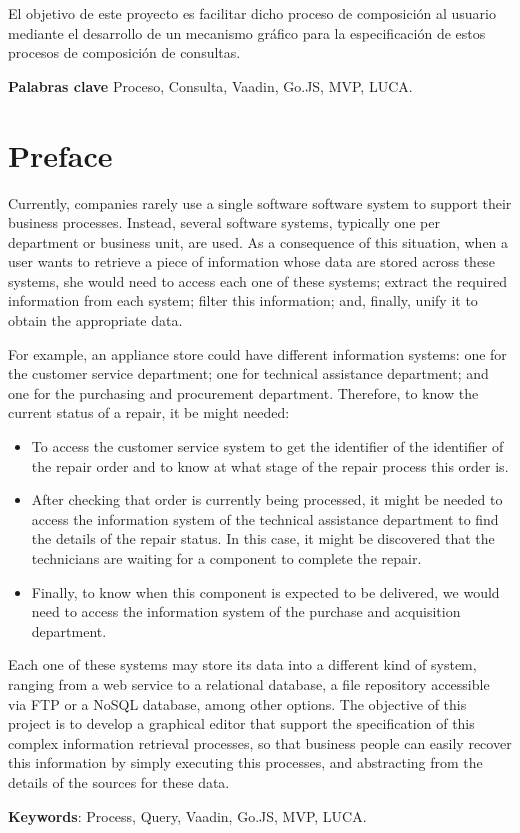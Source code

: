	
El objetivo de este proyecto es facilitar dicho proceso de composición al usuario mediante el desarrollo de un mecanismo gráfico para la especificación de estos procesos de composición de consultas.

	
 \textbf{Palabras clave}
 Proceso, Consulta, Vaadin, Go.JS, MVP, LUCA.
	
\chapter*{Preface}

Currently, companies rarely use a single software software system to support their business processes. Instead, several software systems, typically one per department or business unit, are used.  As a consequence of this situation, when a user wants to retrieve a piece of information whose data are stored across these
systems, she would need to access each one of these systems; extract the required information from each system; filter this information; and, finally, unify it to obtain the appropriate data.
	
For example, an appliance store could have different information systems: one for the customer service department; one for technical assistance department; and one for the purchasing and procurement department. Therefore, to know the current status of a repair, it be might needed:

\begin{itemize}

    \item To access the customer service system to get the identifier of the identifier of the repair order and to know at what stage of the repair process this order is.
    \item After checking that order is currently being processed, it might be needed to access the information system of the technical assistance department to find the details of the repair status. In this case, it might be discovered that the technicians are waiting for a component to complete the repair.
	\item Finally, to know when this component is expected to be delivered, we would need to access the information system of the purchase and acquisition department.
	\end{itemize}

Each one of these systems may store its data into a different kind of system, ranging from a web service to a relational database, a file repository accessible via FTP or a NoSQL database, among other options. The objective of this project is to develop a graphical editor that support the specification of this complex information retrieval processes, so that business people can easily recover this information by simply executing this processes, and abstracting from the details of the sources for these data.


	\textbf{Keywords}:
	Process, Query, Vaadin, Go.JS, MVP, LUCA. 